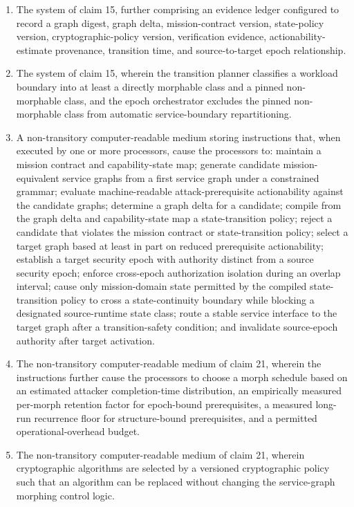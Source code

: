 \documentclass[11pt,letterpaper]{article}
\begin{document}
\begin{enumerate}[leftmargin=2em,itemsep=3pt,label=\arabic*.]
\item The system of claim 15, further comprising an evidence ledger configured to record a graph digest, graph delta, mission-contract version, state-policy version, cryptographic-policy version, verification evidence, actionability-estimate provenance, transition time, and source-to-target epoch relationship.
\item The system of claim 15, wherein the transition planner classifies a workload boundary into at least a directly morphable class and a pinned non-morphable class, and the epoch orchestrator excludes the pinned non-morphable class from automatic service-boundary repartitioning.
\item A non-transitory computer-readable medium storing instructions that, when executed by one or more processors, cause the processors to: maintain a mission contract and capability-state map; generate candidate mission-equivalent service graphs from a first service graph under a constrained grammar; evaluate machine-readable attack-prerequisite actionability against the candidate graphs; determine a graph delta for a candidate; compile from the graph delta and capability-state map a state-transition policy; reject a candidate that violates the mission contract or state-transition policy; select a target graph based at least in part on reduced prerequisite actionability; establish a target security epoch with authority distinct from a source security epoch; enforce cross-epoch authorization isolation during an overlap interval; cause only mission-domain state permitted by the compiled state-transition policy to cross a state-continuity boundary while blocking a designated source-runtime state class; route a stable service interface to the target graph after a transition-safety condition; and invalidate source-epoch authority after target activation.
\item The non-transitory computer-readable medium of claim 21, wherein the instructions further cause the processors to choose a morph schedule based on an estimated attacker completion-time distribution, an empirically measured per-morph retention factor for epoch-bound prerequisites, a measured long-run recurrence floor for structure-bound prerequisites, and a permitted operational-overhead budget.
\item The non-transitory computer-readable medium of claim 21, wherein cryptographic algorithms are selected by a versioned cryptographic policy such that an algorithm can be replaced without changing the service-graph morphing control logic.

\end{enumerate}
\end{document}
